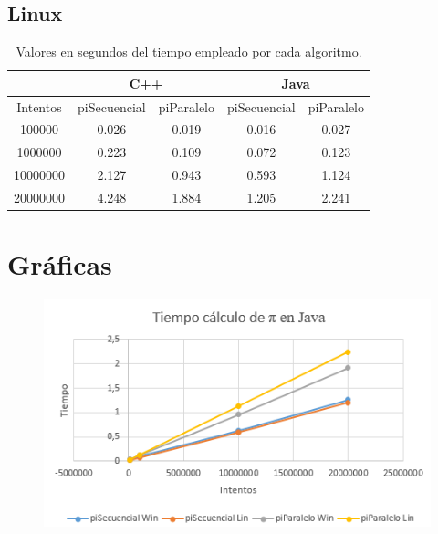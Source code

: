 \documentclass[12pt,letterpaper]{article}
\begin{document}
\subsection{Linux}
\begin{center}
	\begin{table}[htbp]
		\begin{center}
			\begin{tabular}{|c|c|c|c|c|}
				\hline
				& \multicolumn{2}{c|}{C++} & \multicolumn{2}{c|}{Java}  \\
				\hline
				Intentos  & piSecuencial & piParalelo & piSecuencial & piParalelo \\\hline
				100000 & 0.026 & 0.019 & 0.016 & 0.027 \\\hline
				1000000 & 0.223 & 0.109 & 0.072 & 0.123 \\\hline
				10000000 & 2.127 & 0.943 & 0.593 & 1.124 \\\hline
				20000000 & 4.248 & 1.884 & 1.205 & 2.241 \\\hline
			\end{tabular}
			\caption{Valores en segundos del tiempo empleado por cada algoritmo.}
			\label{tabla:Valores en segundos del tiempo empleado por cada algoritmo}
		\end{center}
	\end{table}
\end{center}
\section{Gráficas}
\newpage

\begin{center}
	\begin{figure}
		\includegraphics[scale=1.3]{TiempoPiJava.png}
	\end{figure}
\end{center}
\end{document}
